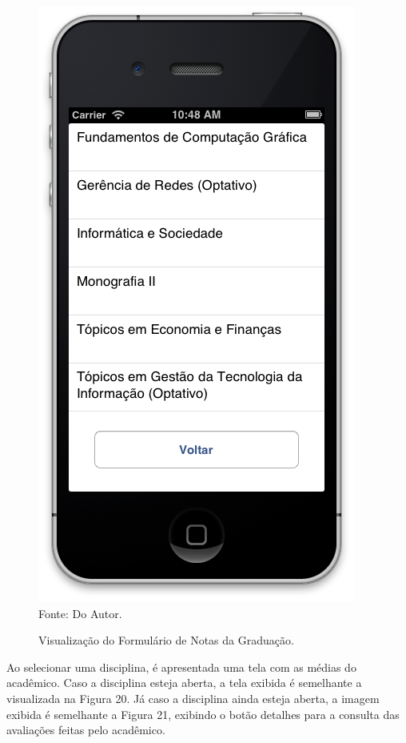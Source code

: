 \begin{figure}[!htb]
     \centering
     \caption[Formulário Notas da Graduação - Lista das Disciplinas]{Visualização do Formulário de Notas da Graduação.}
     \includegraphics[scale=0.5]{imagens/formnotasgraduacao.png}
     \\  Fonte: Do Autor.
\end{figure}
\newpage

Ao selecionar uma disciplina, é apresentada uma tela com as médias do acadêmico. Caso a disciplina esteja aberta, a tela exibida é semelhante a visualizada na Figura 20. Já caso a disciplina ainda esteja aberta, a imagem exibida é semelhante a Figura 21, exibindo o botão detalhes para a consulta das avaliações feitas pelo acadêmico.

